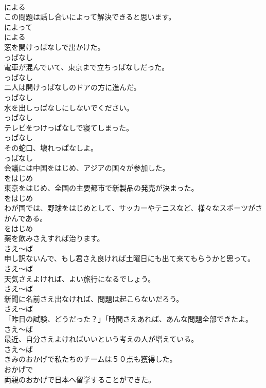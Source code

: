 \documentclass[8pt]{extreport}
\begin{document}
\begin{CJK}{UTF8}{min}
\\	による
\\	この問題は話し合いによって解決できると思います。	
\\	によって 
\\	による
\\	窓を開けっぱなしで出かけた。	
\\	っぱなし
\\	電車が混んでいて、東京まで立ちっぱなしだった。	
\\	っぱなし
\\	二人は開けっぱなしのドアの方に進んだ。	
\\	っぱなし
\\	水を出しっぱなしにしないでください。	
\\	っぱなし
\\	テレビをつけっぱなしで寝てしまった。	
\\	っぱなし
\\	その蛇口、壊れっぱなしよ。	
\\	っぱなし
\\	会議には中国をはじめ、アジアの国々が参加した。	
\\	をはじめ
\\	東京をはじめ、全国の主要都市で新製品の発売が決まった。	
\\	をはじめ
\\	わが国では、野球をはじめとして、サッカーやテニスなど、様々なスポーツがさかんである。	
\\	をはじめ
\\	薬を飲みさえすれば治ります。	
\\	さえ～ば
\\	申し訳ないんで、もし君さえ良ければ土曜日にも出て来てもらうかと思って。	
\\	さえ～ば
\\	天気さえよければ、よい旅行になるでしょう。	
\\	さえ～ば
\\	新聞に名前さえ出なければ、問題は起こらないだろう。	
\\	さえ～ば
\\	「昨日の試験、どうだった？」「時間さえあれば、あんな問題全部できたよ。	
\\	さえ～ば
\\	最近、自分さえよければいいという考えの人が増えている。	
\\	さえ～ば
\\	きみのおかげで私たちのチームは５０点も獲得した。	
\\	おかげで
\\	両親のおかげで日本へ留学することができた。	

\end{CJK}
\end{document}
